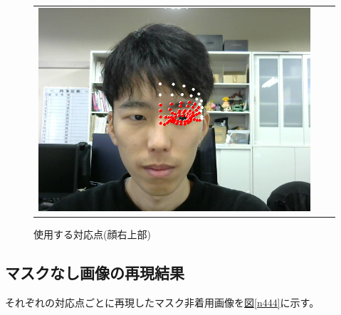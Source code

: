 \documentclass[]{jarticle}          %
\begin{document}
\begin{figure}[!ht]
\begin{tabular}{ccc}
\begin{minipage}[t]{0.33\hsize}
      \centering
      \includegraphics[scale=0.2]{figures/result/landmark_right.png}
      \caption{使用する対応点(顔右上部)}
      \label{n443}
    \end{minipage}
  \end{tabular}
\end{figure}

\subsection{マスクなし画像の再現結果}
それぞれの対応点ごとに再現したマスク非着用画像を\hyperref[n444]{図\ref{n444}}に示す。
\end{document}
